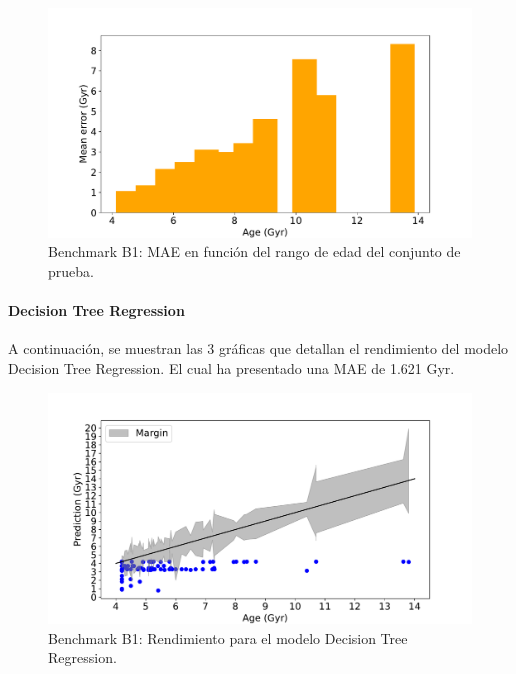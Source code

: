 \begin{figure}[H]
\begin{center}
 \includegraphics[width=0.8\linewidth]{Figuras/Experimentos/B_B1_svm_3.pdf}
\end{center}
\caption{Benchmark B1: MAE en función del rango de edad del conjunto de prueba.}
 \label{fig:benchB1_details_svm_3}
\end{figure}

\paragraph{Decision Tree Regression} 
A continuación, se muestran las 3 gráficas que detallan el rendimiento del modelo Decision Tree Regression. El cual ha presentado una MAE de 1.621 Gyr.
\begin{figure}[H]
\begin{center}
 \includegraphics[width=0.8\linewidth]{Figuras/Experimentos/B_B1_dtr_1.pdf}
\end{center}
\caption{Benchmark B1: Rendimiento para el modelo Decision Tree Regression.}
 \label{fig:benchB1_details_dtr_1}
\end{figure}

